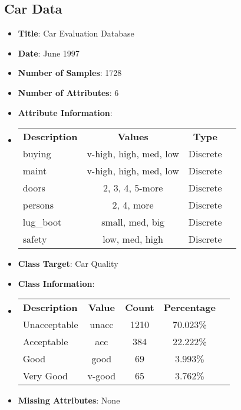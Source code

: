 \documentclass[11pt]{article}
\newcommand{\bb}{\textbf}
\begin{document}
\subsection{Car Data}
\begin{itemize}[leftmargin=*]
  \item[] \bb{Title}: Car Evaluation Database
  \item[] \bb{Date}: June 1997
  \item[] \bb{Number of Samples}: 1728
  \item[] \bb{Number of Attributes}: 6
  \item[] \bb{Attribute Information}:
  \item[]
  \begin{tabular}{l c c c }
    \bb{Description} & \bb{Values}            & \bb{Type} \\
    buying           & v-high, high, med, low & Discrete  \\
    maint            & v-high, high, med, low & Discrete  \\
    doors            & 2, 3, 4, 5-more        & Discrete  \\
    persons          & 2, 4, more             & Discrete  \\
    lug\_boot        & small, med, big        & Discrete  \\
    safety           & low, med, high         & Discrete
  \end{tabular}
  \item[] \bb{Class Target}: Car Quality
  \item[] \bb{Class Information}:
  \item[]
  \begin{tabular}{l c c c c }
    \bb{Description} & \bb{Value} & \bb{Count} & \bb{Percentage} \\
    Unacceptable     & unacc      & 1210       & 70.023\%        \\
    Acceptable       & acc        & 384        & 22.222\%        \\
    Good             & good       & 69         & 3.993\%         \\
    Very Good        & v-good     & 65         & 3.762\%
  \end{tabular}
  \item[] \bb{Missing Attributes}: None
\end{itemize}
\end{document}
